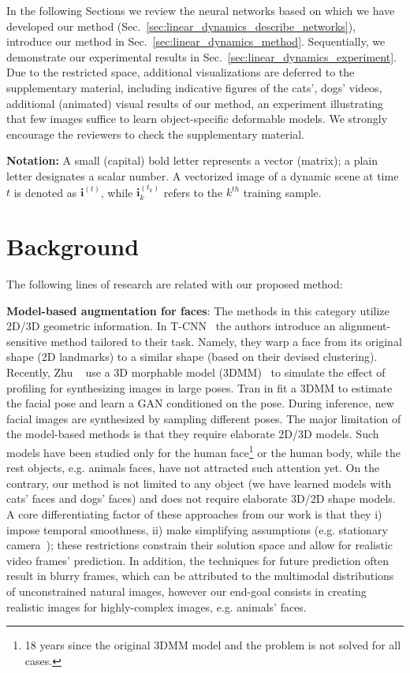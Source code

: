 \documentclass[10pt,twocolumn,letterpaper]{article}
\begin{document}
In the following Sections we review the neural networks based on which we have developed our method (Sec.~\ref{sec:linear_dynamics_describe_networks}), introduce our method in Sec.~\ref{sec:linear_dynamics_method}. Sequentially, we demonstrate our experimental results in Sec.~\ref{sec:linear_dynamics_experiment}. Due to the restricted space, additional visualizations are deferred to the supplementary material, including indicative figures of the cats', dogs' videos, additional (animated) visual results of our method, an experiment illustrating that few images suffice to learn object-specific deformable models. We strongly encourage the reviewers to check the supplementary material.

\textbf{Notation:} A small (capital) bold letter represents a vector (matrix); a plain letter designates a scalar number. A vectorized image of a dynamic scene at time $t$ is denoted as $\bm{i}^{(t)}$, while $\bm{i}_k^{(t_k)}$ refers to the $k^{th}$ training sample.

\section{Background}
The following lines of research are related with our proposed method:

\label{sec:linear_dynamics_related_work}\textbf{Model-based augmentation for faces}: The methods in this category utilize 2D/3D geometric information. In T-CNN~\cite{wu2015facial} the authors introduce an alignment-sensitive method tailored to their task. Namely, they warp a face from its original shape (2D landmarks) to a similar shape (based on their devised clustering).  Recently, Zhu \etal~\cite{zhu2016face} use a 3D morphable model (3DMM)~\cite{blanz1999morphable} to simulate the effect of profiling for synthesizing images in large poses. Tran \etal in \cite{tran2017disentangled} fit a 3DMM to estimate the facial pose and learn a GAN conditioned on the pose. During inference, new facial images are synthesized by sampling different poses. The major limitation of the model-based methods is that they require elaborate 2D/3D models. Such models have been studied only for the human face\footnote{18 years since the original 3DMM model and the problem is not solved for all cases.} or the human body, while the rest objects, e.g. animals faces, have not attracted such attention yet. On the contrary, our method is not limited to any object (we have learned models with cats' faces and dogs' faces) and does not require elaborate 3D/2D shape models.
A core differentiating factor of these approaches from our work is that they i) impose temporal smoothness, ii) make simplifying assumptions (e.g. stationary camera~\cite{vondrick2016generating}); these restrictions constrain their solution space and allow for realistic video frames' prediction. In addition, the techniques for future prediction often result in blurry frames, which can be attributed to the multimodal distributions of unconstrained natural images, however our end-goal consists in creating realistic images for highly-complex images, e.g. animals' faces.
\end{document}
